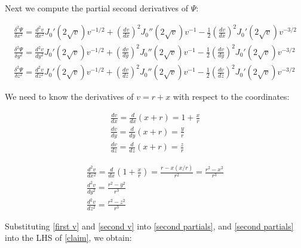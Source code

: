 \documentclass{article}
\begin{document}
\vskip 12pt

Next we compute the partial second derivatives of $\Psi$:

\begin{equation}
\label{second partials}
\begin{gathered}
\frac{\delta^2 \Psi}{\delta x^2} = \frac{d^2 v}{d x^2} J_0'(2\sqrt{v}) v^{-1/2} + \left(\frac{d v}{d x}\right)^2 J_0''(2\sqrt{v}) v^{-1} - \frac{1}{2} \left(\frac{d v}{d x}\right)^2 J_0'(2\sqrt{v}) v^{-3/2} \\
\frac{\delta^2 \Psi}{\delta y^2} = \frac{d^2 v}{d y^2} J_0'(2\sqrt{v}) v^{-1/2} + \left(\frac{d v}{d y}\right)^2 J_0''(2\sqrt{v}) v^{-1} - \frac{1}{2} \left(\frac{d v}{d y}\right)^2 J_0'(2\sqrt{v}) v^{-3/2} \\
\frac{\delta^2 \Psi}{\delta z^2} = \frac{d^2 v}{d z^2} J_0'(2\sqrt{v}) v^{-1/2} + \left(\frac{d v}{d z}\right)^2 J_0''(2\sqrt{v}) v^{-1} - \frac{1}{2} \left(\frac{d v}{d z}\right)^2 J_0'(2\sqrt{v}) v^{-3/2}
\end{gathered}
\end{equation}

\vskip 12pt

We need to know the derivatives of $v=r+x$ with respect to the coordinates:

\vskip 12pt

\begin{equation}
\label{first v}
\begin{gathered}
\frac{d v}{d x} = \frac{d}{d x} (x+r) = 1 + \frac{x}{r} \\
\frac{d v}{d y} = \frac{d}{d y} (x+r) = \frac{y}{r} \\
\frac{d v}{d z} = \frac{d}{d z} (x+r) = \frac{z}{r}
\end{gathered}
\end{equation}

\vskip 12pt

\begin{equation}
\label{second v}
\begin{gathered}
\frac{d^2 v}{d x^2} = \frac{d}{d x} \left(1 + \frac{x}{r}\right) = \frac{r - x(x/r)}{r^2} = \frac{r^2 - x^2}{r^3} \\
\frac{d^2 v}{d y^2} = \frac{r^2 - y^2}{r^3} \\
\frac{d^2 v}{d z^2} = \frac{r^2 - z^2}{r^3}
\end{gathered}
\end{equation}

\vskip 20pt

Substituting \eqref{first v} and \eqref{second v} into \eqref{second partials}, and \eqref{second partials}
into the LHS of \eqref{claim}, we obtain:
\end{document}
